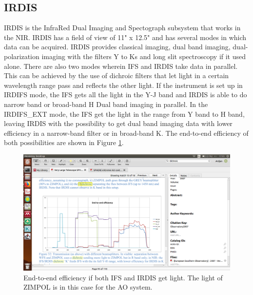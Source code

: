 \documentclass[twoside,single]{lion-msc}
\begin{document}
\subsection{IRDIS}
IRDIS is the InfraRed Dual Imaging and Spectograph subsystem that works in the NIR. IRDIS has a field of view of 11" x 12.5" and has several modes in which data can be acquired. IRDIS provides classical imaging, dual band imaging, dual-polarization imaging with the filters Y to Ks and long slit spectroscopy if it used alone. There are also two modes wherein IFS and IRDIS take data in parallel. This can be achieved by the use of dichroic filters that let light in a certain wavelength range pass and reflects the other light. If the instrument is set up in IRDIFS mode, the IFS gets all the light in the Y-J band and IRDIS is able to do narrow band or broad-band H Dual band imaging in parallel. In the IRDIFS\_EXT mode, the IFS get the light in the range from Y band to H band, leaving IRDIS with the possibility to get dual band imaging data with lower efficiency in a narrow-band filter or in broad-band K. The end-to-end efficiency of both possibilities are shown in Figure \ref{fig:systemthrougput}. 

\begin{figure}[htbp]
\centering
\includegraphics[trim={4cm 4.3cm 16cm 9cm},clip,width = \textwidth]{systemthroughput}
\caption{End-to-end efficiency if both IFS and IRDIS get light. The light of ZIMPOL is in this case for the AO system.}
\label{fig:systemthrougput}
\end{figure}
\end{document}

